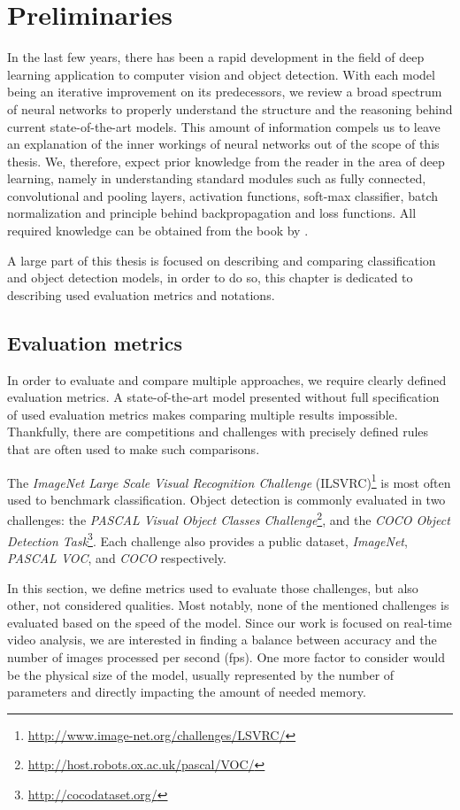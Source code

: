 \chapter{Preliminaries}
\label{chap:prelim}
In the last few years, there has been a rapid development in the field of deep learning application to computer vision and object detection. With each model being an iterative improvement on its predecessors, we review a broad spectrum of neural networks to properly understand the structure and the reasoning behind current state-of-the-art models. This amount of information compels us to leave an explanation of the inner workings of neural networks out of the scope of this thesis. We, therefore, expect prior knowledge from the reader in the area of deep learning, namely in understanding standard modules such as fully connected, convolutional and pooling layers, activation functions, soft-max classifier, batch normalization and principle behind backpropagation and loss functions. All required knowledge can be obtained from the book by \citet{bib:dlbook}.

A large part of this thesis is focused on describing and comparing classification and object detection models, in order to do so, this chapter is dedicated to describing used evaluation metrics and notations.

\section{Evaluation metrics}
In order to evaluate and compare multiple approaches, we require clearly defined evaluation metrics. A state-of-the-art model presented without full specification of used evaluation metrics makes comparing multiple results impossible. Thankfully, there are competitions and challenges with precisely defined rules that are often used to make such comparisons. 

The \textit{ImageNet Large Scale Visual Recognition Challenge }(ILSVRC)\footnote{\url{http://www.image-net.org/challenges/LSVRC/}} is most often used to benchmark classification. Object detection is commonly evaluated in two challenges: the \textit{PASCAL Visual Object Classes Challenge}\footnote{\url{http://host.robots.ox.ac.uk/pascal/VOC/}}, and the \textit{COCO Object Detection Task}\footnote{\url{http://cocodataset.org/}}. Each challenge also provides a public dataset, \textit{ImageNet}, \textit{PASCAL VOC}, and \textit{COCO} respectively.

In this section, we define metrics used to evaluate those challenges, but also other, not considered qualities. Most notably, none of the mentioned challenges is evaluated based on the speed of the model. Since our work is focused on real-time video analysis, we are interested in finding a balance between accuracy and the number of images processed per second (fps). One more factor to consider would be the physical size of the model, usually represented by the number of parameters and directly impacting the amount of needed memory.


